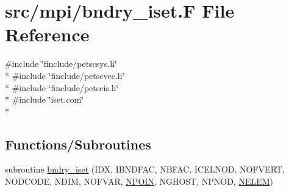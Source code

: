 \hypertarget{mpi_2bndry__iset_8_f}{\section{src/mpi/bndry\-\_\-iset.F File Reference}
\label{mpi_2bndry__iset_8_f}
}
{\ttfamily \#include \char`\"{}finclude/petscsys.\-h\char`\"{}}\\*
{\ttfamily \#include \char`\"{}finclude/petscvec.\-h\char`\"{}}\\*
{\ttfamily \#include \char`\"{}finclude/petscis.\-h\char`\"{}}\\*
{\ttfamily \#include \char`\"{}iset.\-com\char`\"{}}\\*
\subsection*{Functions/\-Subroutines}
\begin{DoxyCompactItemize}
\item 
subroutine \hyperlink{mpi_2bndry__iset_8_f_a3ce236fe0d6f207b1ab939ebe105fcd1}{bndry\-\_\-iset} (I\-D\-X, I\-B\-N\-D\-F\-A\-C, N\-B\-F\-A\-C, I\-C\-E\-L\-N\-O\-D, N\-O\-F\-V\-E\-R\-T, N\-O\-D\-C\-O\-D\-E, N\-D\-I\-M, N\-O\-F\-V\-A\-R, \hyperlink{mesh_8com_ae28c1572321efcd8715b974d87d20c58}{N\-P\-O\-I\-N}, N\-G\-H\-O\-S\-T, N\-P\-N\-O\-D, \hyperlink{mesh_8com_aee5e75b79d0e815c0603cfbccc618957}{N\-E\-L\-E\-M})
\end{DoxyCompactItemize}


